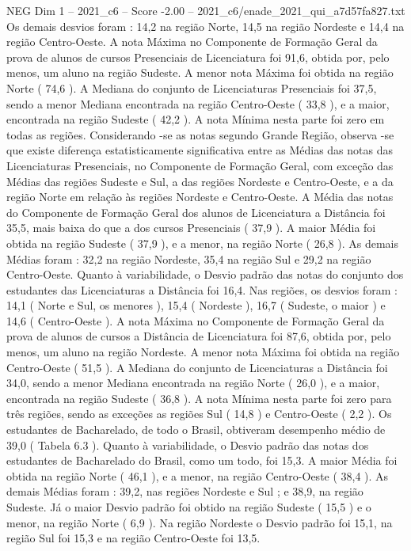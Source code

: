 \begin{textsample}{NEG Dim 1 – 2021\_c6 – Score -2.00 – 2021\_c6/enade\_2021\_qui\_a7d57fa827.txt}
Os demais desvios foram : 14,2 na região Norte, 14,5 na região Nordeste e 14,4 na região Centro-Oeste.
A nota Máxima no Componente de Formação Geral da prova de alunos de cursos Presenciais de Licenciatura foi 91,6, obtida por, pelo menos, um aluno na região Sudeste.
A menor nota Máxima foi obtida na região Norte ( 74,6 ).
A Mediana do conjunto de Licenciaturas Presenciais foi 37,5, sendo a menor Mediana encontrada na região Centro-Oeste ( 33,8 ), e a maior, encontrada na região Sudeste ( 42,2 ).
A nota Mínima nesta parte foi zero em todas as regiões.
Considerando -se as notas segundo Grande Região, observa -se que existe diferença estatisticamente significativa entre as Médias das notas das Licenciaturas Presenciais, no Componente de Formação Geral, com exceção das Médias das regiões Sudeste e Sul, a das regiões Nordeste e Centro-Oeste, e a da região Norte em relação às regiões Nordeste e Centro-Oeste.
A Média das notas do Componente de Formação Geral dos alunos de Licenciatura a Distância foi 35,5, mais baixa do que a dos cursos Presenciais ( 37,9 ).
A maior Média foi obtida na região Sudeste ( 37,9 ), e a menor, na região Norte ( 26,8 ).
As demais Médias foram : 32,2 na região Nordeste, 35,4 na região Sul e 29,2 na região Centro-Oeste.
Quanto à variabilidade, o Desvio padrão das notas do conjunto dos estudantes das Licenciaturas a Distância foi 16,4.
Nas regiões, os desvios foram : 14,1 ( Norte e Sul, os menores ), 15,4 ( Nordeste ), 16,7 ( Sudeste, o maior ) e 14,6 ( Centro-Oeste ).
A nota Máxima no Componente de Formação Geral da prova de alunos de cursos a Distância de Licenciatura foi 87,6, obtida por, pelo menos, um aluno na região Nordeste.
A menor nota Máxima foi obtida na região Centro-Oeste ( 51,5 ).
A Mediana do conjunto de Licenciaturas a Distância foi 34,0, sendo a menor Mediana encontrada na região Norte ( 26,0 ), e a maior, encontrada na região Sudeste ( 36,8 ).
A nota Mínima nesta parte foi zero para três regiões, sendo as exceções as regiões Sul ( 14,8 ) e Centro-Oeste ( 2,2 ).
Os estudantes de Bacharelado, de todo o Brasil, obtiveram desempenho médio de 39,0 ( Tabela 6.3 ).
Quanto à variabilidade, o Desvio padrão das notas dos estudantes de Bacharelado do Brasil, como um todo, foi 15,3.
A maior Média foi obtida na região Norte ( 46,1 ), e a menor, na região Centro-Oeste ( 38,4 ).
As demais Médias foram : 39,2, nas regiões Nordeste e Sul ; e 38,9, na região Sudeste.
Já o maior Desvio padrão foi obtido na região Sudeste ( 15,5 ) e o menor, na região Norte ( 6,9 ).
Na região Nordeste o Desvio padrão foi 15,1, na região Sul foi 15,3 e na região Centro-Oeste foi 13,5.

\end{textsample}
